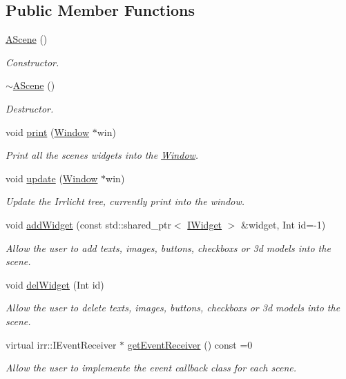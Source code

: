 \subsection*{Public Member Functions}
\begin{DoxyCompactItemize}
\item 
\hyperlink{classAScene_ad0eacf691dbc8240fdf3a42d450c1042}{A\+Scene} ()
\begin{DoxyCompactList}\small\item\em Constructor. \end{DoxyCompactList}\item 
\hyperlink{classAScene_a9faf7f1a271327227e83627432d0b210}{$\sim$\+A\+Scene} ()
\begin{DoxyCompactList}\small\item\em Destructor. \end{DoxyCompactList}\item 
void \hyperlink{classAScene_ae5d7463a823ed64f3846b5847340b68c}{print} (\hyperlink{classWindow}{Window} $\ast$win)
\begin{DoxyCompactList}\small\item\em Print all the scene\textquotesingle{}s widgets into the \hyperlink{classWindow}{Window}. \end{DoxyCompactList}\item 
void \hyperlink{classAScene_a59f0acef6ed02a578062decd0f907773}{update} (\hyperlink{classWindow}{Window} $\ast$win)
\begin{DoxyCompactList}\small\item\em Update the Irrlicht tree, currently print into the window. \end{DoxyCompactList}\item 
void \hyperlink{classAScene_aa711b6068dd8dee262160eedfd96ad02}{add\+Widget} (const std\+::shared\+\_\+ptr$<$ \hyperlink{classIWidget}{I\+Widget} $>$ \&widget, Int id=-\/1)
\begin{DoxyCompactList}\small\item\em Allow the user to add texts, images, buttons, checkboxs or 3d models into the scene. \end{DoxyCompactList}\item 
void \hyperlink{classAScene_ad2b0ac8cd74a8523c76b681a34b5f5b4}{del\+Widget} (Int id)
\begin{DoxyCompactList}\small\item\em Allow the user to delete texts, images, buttons, checkboxs or 3d models into the scene. \end{DoxyCompactList}\item 
virtual irr\+::\+I\+Event\+Receiver $\ast$ \hyperlink{classAScene_af521e5e6d30a5d2e5d30eb333e4d3abd}{get\+Event\+Receiver} () const =0
\begin{DoxyCompactList}\small\item\em Allow the user to implemente the event callback class for each scene. \end{DoxyCompactList}\end{DoxyCompactItemize}


